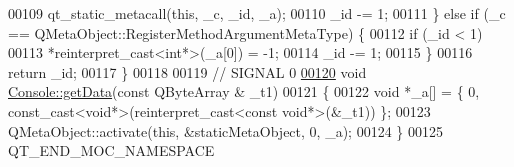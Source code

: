 \begin{DoxyCode}
00109             qt\_static\_metacall(\textcolor{keyword}{this}, \_c, \_id, \_a);
00110         \_id -= 1;
00111     \} \textcolor{keywordflow}{else} \textcolor{keywordflow}{if} (\_c == QMetaObject::RegisterMethodArgumentMetaType) \{
00112         \textcolor{keywordflow}{if} (\_id < 1)
00113             *\textcolor{keyword}{reinterpret\_cast<}\textcolor{keywordtype}{int}*\textcolor{keyword}{>}(\_a[0]) = -1;
00114         \_id -= 1;
00115     \}
00116     \textcolor{keywordflow}{return} \_id;
00117 \}
00118 
00119 \textcolor{comment}{// SIGNAL 0}
\hypertarget{a00013_source_l00120}{}\hyperlink{a00002_a1976aad46ce1a77be730bc628275038f}{00120} \textcolor{keywordtype}{void} \hyperlink{a00002_a1976aad46ce1a77be730bc628275038f}{Console::getData}(\textcolor{keyword}{const} QByteArray & \_t1)
00121 \{
00122     \textcolor{keywordtype}{void} *\_a[] = \{ 0, \textcolor{keyword}{const\_cast<}\textcolor{keywordtype}{void}*\textcolor{keyword}{>}(\textcolor{keyword}{reinterpret\_cast<}\textcolor{keyword}{const }\textcolor{keywordtype}{void}*\textcolor{keyword}{>}(&\_t1)) \};
00123     QMetaObject::activate(\textcolor{keyword}{this}, &staticMetaObject, 0, \_a);
00124 \}
00125 QT\_END\_MOC\_NAMESPACE
\end{DoxyCode}
